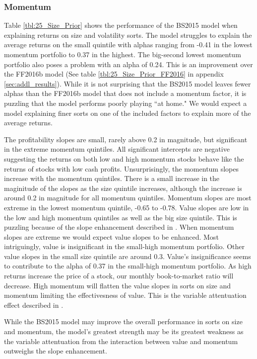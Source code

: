 
\subsubsection{Momentum}


Table \ref{tbl:25_Size_Prior} shows the performance of the BS2015 model when
explaining returns on size and volatility sorts. The model struggles to explain the
average returns on the small quintile with alphas ranging from -0.41 in the lowest
momentum portfolio to 0.37 in the highest. The big-second lowest momentum portfolio also
poses a problem with an alpha of 0.24. This is an improvement over the FF2016b model (See
table \ref{tbl:25_Size_Prior_FF2016} in appendix \ref{sec:addl_results}). While it is not
surprising that the BS2015 model leaves fewer alphas than the FF2016b model that does not
include a momentum factor, it is puzzling that the model performs poorly playing ``at
home." We would expect a model explaining finer sorts on one of the included factors to
explain more of the average returns.

The profitability slopes are small, rarely above 0.2 in magnitude, but significant in the
extreme momentum quintiles. All significant intercepts are negative suggesting the returns
on both low and high momentum stocks behave like the returns of stocks with low cash
profits. Unsurprisingly, the momentum slopes increase with the momentum quintiles. There
is a small increase in the maginitude of the slopes as the size quintile increases,
although the increase is around 0.2 in magnitude for all momentum quintiles. Momentum
slopes are most extreme in the lowest momentum quintile, -0.65 to -0.78. Value slopes are
low in the low and high momentum quintiles as well as the big size quintile. This is
puzzling because of the slope enhancement described in \textcite{fama2015incremental}.
When momentum slopes are extreme we would expect value slopes to be enhanced. Most
intriguingly, value is insignificant in the small-high momentum portfolio. Other value
slopes in the small size quintile are around 0.3. Value's insignificance seems to
contribute to the alpha of 0.37 in the small-high momentum portfolio. As high returns
increase the price of a stock, our monthly book-to-market ratio will decrease. High
momentum will flatten the value slopes in sorts on size and momentum limiting the
effectivesness of value. This is the variable attentuation effect described in
\textcite{fama2015incremental}.

While the BS2015 model may improve the overall performance in sorts on size and momentum,
the model's greatest strength may be its greatest weakness as the variable attentuation
from the interaction between value and momentum outweighs the slope enhancement.

